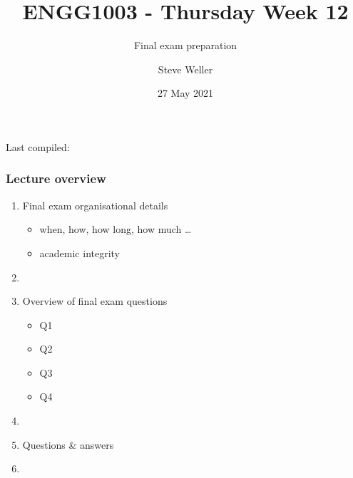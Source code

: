 \documentclass[english,14pt]{beamer}
\title{ENGG1003 - Thursday Week 12}
\subtitle{Final exam preparation}
\author{Steve Weller}
\institute{University of Newcastle}
\date{27 May 2021}
\begin{document}
\begin{flushleft}
{\scriptsize Last compiled:~\DTMnow}
\vspace*{-5mm}
\end{flushleft}
\framebreak


\begin{frame}[fragile]

\frametitle{Lecture overview}
\begin{enumerate}
	\item Final exam organisational details
	\begin{itemize}
		\item when, how, how long, how much \ldots
		\item academic integrity
	\end{itemize}
	
	\item[]
	
	\item Overview of final exam questions
	\begin{itemize}
		\item Q1
		\item Q2
		\item Q3
		\item Q4
	\end{itemize}

	\item[]
	
	\item Questions \& answers

	\item[]

\end{enumerate}

\end{frame}

\end{document}
